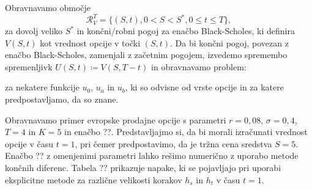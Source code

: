 \documentclass{article}
\theoremstyle{definition}
\begin{document}
Obravnavamo območje
\begin{equation}
    \mathcal{R}^T_V = \{(S, t), 0 < S < S^*, 0 \leq t \leq T\},
\end{equation}
za dovolj veliko $S^*$ in končni/robni pogoj za enačbo Black-Scholes, ki definira $V(S, t)$ kot vrednost opcije v točki $(S, t)$. Da bi končni pogoj, povezan z enačbo Black-Scholes, zamenjali z začetnim pogojem, izvedemo spremembo spremenljivk $U(S, t) \coloneqq V(S, T - t)$ in obravnavamo problem:

    
za nekatere funkcije $u_0$, $u_a$ in $u_b$, ki so odvisne od vrste opcije in za katere predpostavljamo, da so znane.

Obravnavamo primer evropske prodajne opcije s parametri $r = 0,08$, $\sigma = 0,4$, $T = 4$ in $K = 5$ in enačbo ??. 
Predstavljajmo si, da bi morali izračunati vrednost opcije v času $t = 1$, pri čemer predpostavimo, da je tržna cena sredstva $S = 5$.
Enačbo ?? z omenjenimi parametri lahko rešimo numerično z uporabo metode končnih diferenc. 
Tabela ?? prikazuje napake, ki se pojavljajo pri uporabi eksplicitne metode za različne velikosti korakov
$h_s$ in $h_t$ v času $t=1$.

 
    \centering

\end{document}
